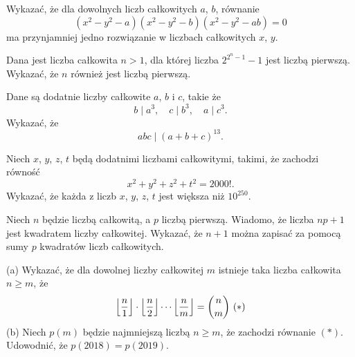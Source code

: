 \begin{problem}{1}
	Wykazać, że dla dowolnych liczb całkowitych $a$, $b$, równanie
	\[
		(x^2 - y^2 - a)(x^2 - y^2 - b)(x^2 - y^2 - ab) = 0
	\]
	ma przynjamniej jedno rozwiązanie w liczbach całkowitych $x$, $y$.
\end{problem}

\begin{problem}{2}
	Dana jest liczba całkowita $n > 1$, dla której liczba $2^{2^n - 1} - 1$ jest liczbą pierwszą. Wykazać, że $n$ również jest liczbą pierwszą.
\end{problem}

\begin{problem}{3}
	Dane są dodatnie liczby całkowite $a$, $b$ i $c$, takie że
	\[
		b \mid a^3, \quad c \mid b^3, \quad a \mid c^3.
	\]
	Wykazać, że
	\[
		abc \mid (a + b + c)^{13}.
	\]
\end{problem}

\begin{problem}{4}
	Niech $x$, $y$, $z$, $t$ będą dodatnimi liczbami całkowitymi, takimi, że zachodzi równość
	\[
		x^2 + y^2 + z^2 + t^2 = 2000!.
	\]
	Wykazać, że każda z liczb $x$, $y$, $z$, $t$ jest większa niż $10^{250}$.
\end{problem}

\begin{problem}{5}
	Niech $n$ będzie liczbą całkowitą, a $p$ liczbą pierwszą. Wiadomo, że liczba $np + 1$ jest kwadratem liczby całkowitej. Wykazać, że $n + 1$ można zapisać za pomocą sumy $p$ kwadratów liczb całkowitych.
\end{problem}


\begin{problem}{6}
	(a) Wykazać, że dla dowolnej liczby całkowitej $m$ istnieje taka liczba całkowita $n\geqslant m$, że
\[
	\left \lfloor \frac{n}{1} \right \rfloor \cdot \left \lfloor \frac{n}{2} \right \rfloor \cdots \left \lfloor \frac{n}{m} \right \rfloor = \binom{n}{m} \\\\\\\\\\\\\\\        (*)
\]
(b) Niech $p(m)$ będzie najmniejszą liczbą $n \geqslant m$, że zachodzi równanie  $(*)$. Udowodnić, że $p(2018) = p(2019).$
\end{problem}







